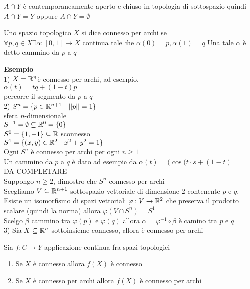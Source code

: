 \documentclass[12px]{article}
\begin{document}
 \begin{dimo}
$A\cap Y$ è contemporaneamente aperto e chiuso in topologia di sottospazio quindi  $A\cap Y = Y$ oppure  $A\cap Y = \emptyset$
 \end{dimo}
 \begin{defi}
	 Uno spazio topologico $X$ si dice connesso per archi se \\ $\forall p,q\in X\exists \alpha: [0,1] \rightarrow X$ continua tale che $\alpha(0) = p, \alpha(1) = q$ Una tale  $\alpha $ è detto cammino da $p$ a $q$
 \end{defi}
 \textbf{Esempio}\\
 1) $X = \mathbb{R}^n$è connesso per archi, ad esempio.\\
 $\alpha(t) = tq + (1-t)p$\\
 percorre il segmento  da $p$ a  $q$\\
 2) $S^n = \{p\in\mathbb{R}^{n + 1} \ | \ ||p|| = 1\}$\\
 sfera  $n$-dimensionale \\
 $S^{-1} = \emptyset\subseteq\mathbb{R}^0 =\{0\}$\\
 $S^0 = \{1,-1\}\subseteq \mathbb{R}$ sconnesso\\
 $S^1 = \{(x,y)\in\mathbb{R}^2\ |\ x^2 + y^2 = 1\}$\\
 Ogni  $S^n$ è connesso per archi per ogni $n\geq 1$\\
 Un cammino da  $p$ a $q$ è dato ad esempio da $\alpha(t) = (\cos(t\cdot s + (1-t)$\\
 DA COMPLETARE\\
 Suppongo $n\geq 2$, dimostro che  $S^n$ connesso per archi\\
 Scegliamo  $V\subseteq\mathbb{R}^{n+1}$ sottospazio vettoriale di dimensione  $2$ contenente $p$ e $q$. Esiste un isomorfismo di spazi vettoriali  $ \varphi:V \rightarrow \mathbb{R}^2$ che preserva il prodotto scalare (quindi la norma) allora $ \varphi(V\cap S^n) = S^1$\\
 Scelgo $\beta$ cammino tra $ \varphi(p)$ e $ \varphi(q)$ allora $
 \alpha = \varphi^{-1}\circ \beta$ è camino tra $p$ e  $q$\\
 3) Sia   $X\subseteq \mathbb{R}^n$ sottoinsieme connesso, allora è connesso per archi 
 \begin{teo}
 	Sia $f:C \rightarrow Y$ applicazione continua fra spazi topologici
	\begin{enumerate}
		\item Se $X$ è connesso allora $f(X)$ è connesso
		\item Se $X$ è connesso per archi allora $f(X)$ è connesso per archi
	\end{enumerate}
 \end{teo}
\end{document}
